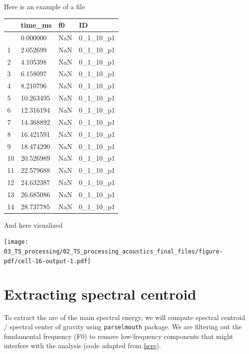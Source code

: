 \documentclass[
  letterpaper,
  DIV=11,
  numbers=noendperiod]{scrreprt}
\begin{document}
Here is an example of a file

\begin{longtable}[]{@{}llll@{}}
\toprule\noalign{}
& time\_ms & f0 & ID \\
\midrule\noalign{}
\endhead
\bottomrule\noalign{}
\endlastfoot
0 & 0.000000 & NaN & 0\_1\_10\_p1 \\
1 & 2.052699 & NaN & 0\_1\_10\_p1 \\
2 & 4.105398 & NaN & 0\_1\_10\_p1 \\
3 & 6.158097 & NaN & 0\_1\_10\_p1 \\
4 & 8.210796 & NaN & 0\_1\_10\_p1 \\
5 & 10.263495 & NaN & 0\_1\_10\_p1 \\
6 & 12.316194 & NaN & 0\_1\_10\_p1 \\
7 & 14.368892 & NaN & 0\_1\_10\_p1 \\
8 & 16.421591 & NaN & 0\_1\_10\_p1 \\
9 & 18.474290 & NaN & 0\_1\_10\_p1 \\
10 & 20.526989 & NaN & 0\_1\_10\_p1 \\
11 & 22.579688 & NaN & 0\_1\_10\_p1 \\
12 & 24.632387 & NaN & 0\_1\_10\_p1 \\
13 & 26.685086 & NaN & 0\_1\_10\_p1 \\
14 & 28.737785 & NaN & 0\_1\_10\_p1 \\
\end{longtable}

And here visualized

\texttt{[image: 03\_TS\_processing/02\_TS\_processing\_acoustics\_final\_files/figure-pdf/cell-16-output-1.pdf]}


\chapter{Extracting spectral
centroid}\label{extracting-spectral-centroid}

To extract the are of the main spectral energy, we will compute spectral
centroid / spectral center of gravity using \texttt{parselmouth}
package. We are filtering out the fundamental frequency (F0) to remove
low-frequency components that might interfere with the analysis (code
adapted from
\href{https://se.mathworks.com/matlabcentral/fileexchange/104555-digital-signal-processing-system-analysis-and-design?focused=b988de35-99f5-4f66-a67f-c014b9c170b1&tab=function}{here}).
\end{document}
